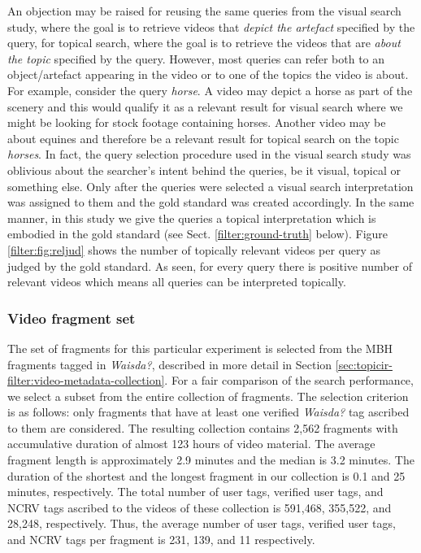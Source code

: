 An objection may be raised for reusing the same queries from the visual search study, where the goal is to retrieve videos that \textit{depict the artefact} specified by the query, for topical search, where the goal is to retrieve the videos that are \textit{about the topic} specified by the query. However, most queries can refer both to an object/artefact appearing in the video or to one of the topics the video is about. For example, consider the query \textit{horse}. A video may depict a horse as part of the scenery and this would qualify it as a relevant result for visual search where we might be looking for stock footage containing horses.  Another video may be about equines and therefore be a relevant result for topical search on the topic \textit{horses}.
In fact, the query selection procedure used in the visual search study \cite{ecir} was oblivious about the searcher's intent behind the queries, be it visual, topical or something else. Only after the queries were selected a visual search interpretation was assigned to them and the gold standard was created accordingly. In the same manner, in this study we give the queries a topical interpretation which is embodied in the gold standard (see Sect. \ref{filter:ground-truth} below). Figure \ref{filter:fig:reljud} shows the number of topically relevant videos per query as judged by the gold standard. As seen, for every query there is positive number of relevant videos which means all queries can be interpreted topically.

\subsubsection{Video fragment set}
The set of fragments for this particular experiment is selected from the MBH fragments tagged in \textit{Waisda?}, described in more detail in Section \ref{sec:topicir-filter:video-metadata-collection}. For a fair comparison of the search performance, we select a subset from the entire collection of fragments. The selection criterion is as follows: only fragments that have at least one verified \textit{Waisda?} tag ascribed to them are considered. The resulting collection contains 2,562 fragments with accumulative duration of almost 123 hours of video material.
The average fragment length is approximately 2.9 minutes and the median is 3.2 minutes. The duration of the shortest and the longest fragment in our collection is 0.1 and 25 minutes, respectively. The total number of user tags, verified user tags, and NCRV tags ascribed to the videos of these collection is 591,468, 355,522, and 28,248, respectively. Thus, the average number of user tags, verified user tags, and NCRV tags per fragment is 231, 139, and 11 respectively.


